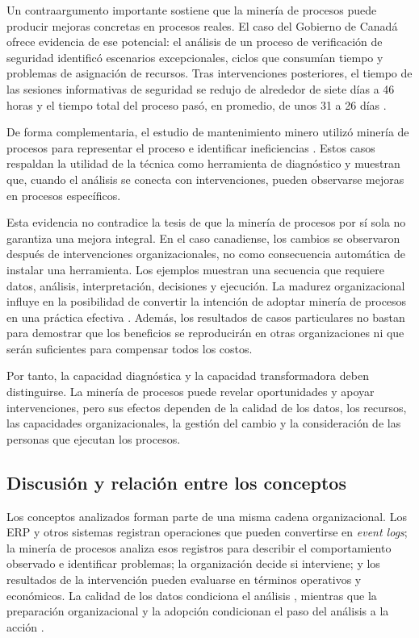 \documentclass{article}
\begin{document}
    Un contraargumento importante sostiene que la minería de procesos puede producir mejoras concretas en procesos reales. El caso del Gobierno de Canadá ofrece evidencia de ese potencial: el análisis de un proceso de verificación de seguridad identificó escenarios excepcionales, ciclos que consumían tiempo y problemas de asignación de recursos. Tras intervenciones posteriores, el tiempo de las sesiones informativas de seguridad se redujo de alrededor de siete días a 46 horas y el tiempo total del proceso pasó, en promedio, de unos 31 a 26 días \cite{digitalservice2024}.

    De forma complementaria, el estudio de mantenimiento minero utilizó minería de procesos para representar el proceso e identificar ineficiencias \cite{miningindustry2023}. Estos casos respaldan la utilidad de la técnica como herramienta de diagnóstico y muestran que, cuando el análisis se conecta con intervenciones, pueden observarse mejoras en procesos específicos.

    Esta evidencia no contradice la tesis de que la minería de procesos por sí sola no garantiza una mejora integral. En el caso canadiense, los cambios se observaron después de intervenciones organizacionales, no como consecuencia automática de instalar una herramienta. Los ejemplos muestran una secuencia que requiere datos, análisis, interpretación, decisiones y ejecución. La madurez organizacional influye en la posibilidad de convertir la intención de adoptar minería de procesos en una práctica efectiva \cite{processminingmaturity2024}. Además, los resultados de casos particulares no bastan para demostrar que los beneficios se reproducirán en otras organizaciones ni que serán suficientes para compensar todos los costos.

    Por tanto, la capacidad diagnóstica y la capacidad transformadora deben distinguirse. La minería de procesos puede revelar oportunidades y apoyar intervenciones, pero sus efectos dependen de la calidad de los datos, los recursos, las capacidades organizacionales, la gestión del cambio y la consideración de las personas que ejecutan los procesos.

    \subsection{Discusión y relación entre los conceptos}

    Los conceptos analizados forman parte de una misma cadena organizacional. Los ERP y otros sistemas registran operaciones que pueden convertirse en \textit{event logs}; la minería de procesos analiza esos registros para describir el comportamiento observado e identificar problemas; la organización decide si interviene; y los resultados de la intervención pueden evaluarse en términos operativos y económicos. La calidad de los datos condiciona el análisis \cite{marin-castro2021preprocessing,eventloggeneration2026}, mientras que la preparación organizacional y la adopción condicionan el paso del análisis a la acción \cite{processminingmaturity2024,talo2025erp}.
\end{document}
